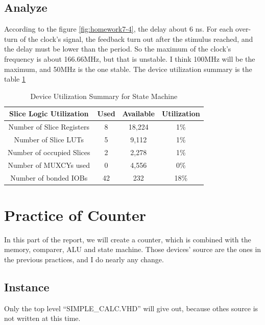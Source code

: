 \documentclass{article}
\begin{document}
    \subsection{Analyze}

    According to the figure \ref{fig:homework7-4}, the delay about 6 ns. For each over-turn of the clock's signal,
    the feedback turn out after the stimulus reached, and the delay must be lower than the period.
    So the maximum of the clock's frequency is about 166.66MHz, but that is unstable. 
    I think 100MHz will be the maximum, and 50MHz is the one stable.
    The device utilization summary is the table \ref{tab:sm:dus}
    
    \begin{table}[h!]
        \centering
        \begin{tabular}{|c|c|c|c|}
            \hline Slice Logic Utilization & Used & Available & Utilization \\ 
            \hline Number of Slice Registers & 8 & 18,224 & 1\%
            \\ 
            \hline Number of Slice LUTs & 5 & 9,112 & 1\% \\ 
            \hline Number of occupied Slices & 2 & 2,278 & 1\% \\ 
            \hline Number of MUXCYs used & 0 & 4,556 & 0\%
            \\ 
            \hline Number of bonded IOBs & 42 & 232 & 18\% \\ 
            \hline 
        \end{tabular}
        \caption{Device Utilization Summary for State Machine}
        \label{tab:sm:dus}
    \end{table}
    
    \section{Practice of Counter}
    
    In this part of the report, we will create a counter, which is combined with the memory,
    comparer, ALU and state machine.
    Those devices' source are the ones in the previous practices, and I do nearly any change.
    
    \subsection{Instance}
    
    Only the top level ``SIMPLE\_CALC.VHD'' will give out, because othes source is not written at this time.
    
\end{document}
